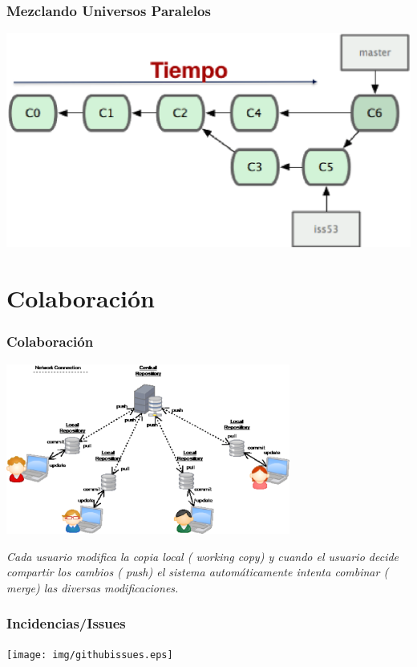 \documentclass{beamer}
\begin{document}
\begin{frame}
\frametitle{Mezclando Universos Paralelos}
\begin{center}
\includegraphics[width=1.0\textwidth]{img/merge.eps}
\end{center}
\end{frame}

\section{Colaboración}
\begin{frame}
\frametitle{Colaboración}
\begin{center}
\includegraphics[width=0.7\textwidth]{img/collaborating1.eps}
\end{center}
{\it 
Cada usuario modifica la copia local ({\color{red} working copy}) 
y cuando el usuario decide
{\color{blue} compartir los cambios} ({\color{red} push}) 
el sistema automáticamente intenta {\color{blue}combinar} ({\color{red} merge})
las diversas modificaciones. 
}
\end{frame}


\begin{frame}
\frametitle{Incidencias/Issues}
\begin{center}
\texttt{[image: img/githubissues.eps]}
\end{center}
\end{frame}
\end{document}
